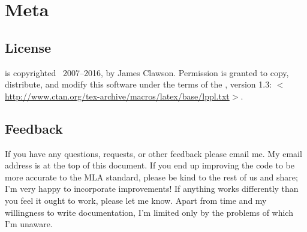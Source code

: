 \documentclass{ltxdockit}[2011/03/25]
\newcommand*{\biblatexmla}{\sty{biblatex-mla}\xspace}
\newcommand*{\mylink}[1]{$<$\url{#1}$>$}
\newcommand*{\mla}{MLA\xspace}
\newenvironment*{optionslistNOT}
  {\list{}{%
     \setlength{\labelwidth}{\marglistwidth}%
     \setlength{\labelsep}{\marglistsep}%
     \setlength{\leftmargin}{0pt}%
     \renewcommand*{\makelabel}[1]{\hss\marglistfont##1}}%
   \def\optionitem##1{%
     \item[{##1}]}}
  {\endlist}
\begin{document}
% 
% 	
% 	
% 
% 
% 	
% 	
% 	
% 	
% 	
% 	
% 	
% 	
% 	
% 	
% 	

\section{Meta}
\subsection{License}

\biblatexmla is copyrighted \textcopyright\ 2007--2016, by James Clawson. Permission is granted to copy, distribute, and modify this software under the terms of the \lppl, version 1.3: \mylink{http://www.ctan.org/tex-archive/macros/latex/base/lppl.txt}.

\subsection[Feedback]{Feedback}
\label{int:feb}

If you have any questions, requests, or other feedback please email me. My email address is at the top of this document. If you end up improving the code to be more accurate to the \mla{} standard, please be kind to the rest of us and share; I'm very happy to incorporate improvements! If anything works differently than you feel it ought to work, please let me know. Apart from time and my willingness to write documentation, I'm limited only by the problems of which I'm unaware.
\end{document}
